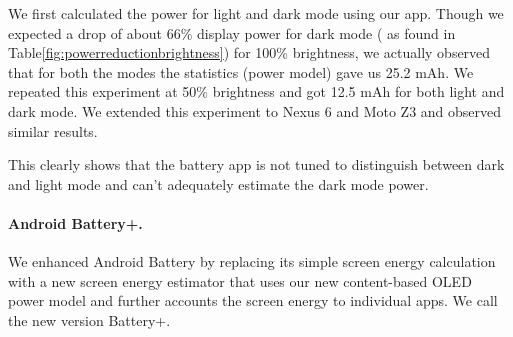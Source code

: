 We first calculated the power for light and dark mode using our app.
Though we expected a drop of about 66\% display power for dark mode
( as found in Table\ref{fig:powerreductionbrightness}) for 100\% brightness,
we actually observed that for both the modes the statistics (power model) gave us 25.2 mAh.
We repeated this experiment at 50\% brightness and got 12.5 mAh for both light and dark mode.
We extended this experiment to Nexus 6 and Moto Z3 and observed similar results.

This clearly shows that the battery app is not tuned to distinguish between dark and light mode
and can't adequately estimate the dark mode power.
\fi

\paragraph{Android Battery+.}
We enhanced Android Battery by replacing its
simple screen energy calculation
with a new screen energy estimator that uses our new content-based OLED power model
and further accounts the screen energy to individual apps.
We call the new version Battery+.


